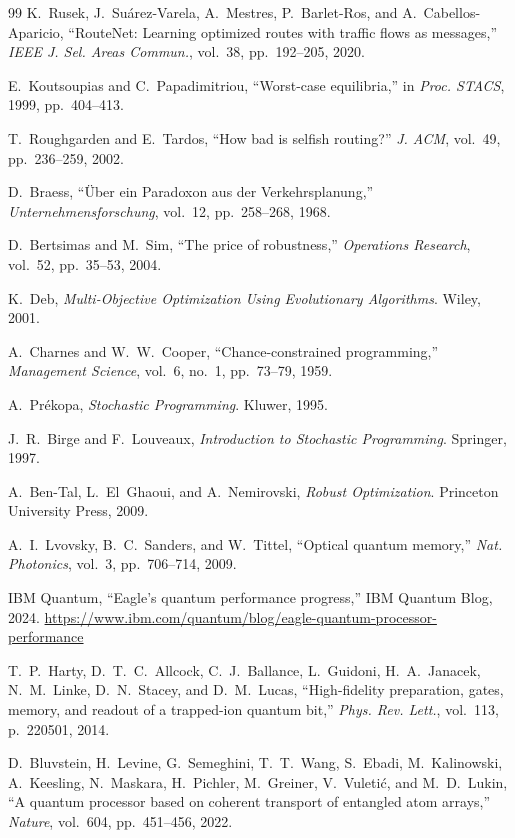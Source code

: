 \documentclass[twocolumn]{article}
\begin{document}
\begin{thebibliography}{99}
K.~Rusek, J.~Su\'arez-Varela, A.~Mestres, P.~Barlet-Ros, and
A.~Cabellos-Aparicio, ``RouteNet: Learning optimized routes with
traffic flows as messages,''
\emph{IEEE J. Sel. Areas Commun.}, vol.~38, pp.~192--205, 2020.

E.~Koutsoupias and C.~Papadimitriou,
``Worst-case equilibria,''
in \emph{Proc. STACS}, 1999, pp.~404--413.

T.~Roughgarden and E.~Tardos,
``How bad is selfish routing?''
\emph{J. ACM}, vol.~49, pp.~236--259, 2002.

D.~Braess, ``\"Uber ein Paradoxon aus der Verkehrsplanung,''
\emph{Unternehmensforschung}, vol.~12, pp.~258--268, 1968.

D.~Bertsimas and M.~Sim, ``The price of robustness,''
\emph{Operations Research}, vol.~52, pp.~35--53, 2004.

K.~Deb, \emph{Multi-Objective Optimization Using Evolutionary
Algorithms}.  Wiley, 2001.

A.~Charnes and W.~W.~Cooper,
``Chance-constrained programming,''
\emph{Management Science}, vol.~6, no.~1, pp.~73--79, 1959.

A.~Pr\'ekopa, \emph{Stochastic Programming}.  Kluwer, 1995.

J.~R.~Birge and F.~Louveaux, \emph{Introduction to Stochastic
Programming}.  Springer, 1997.

A.~Ben-Tal, L.~El~Ghaoui, and A.~Nemirovski, \emph{Robust
Optimization}.  Princeton University Press, 2009.

A.~I.~Lvovsky, B.~C.~Sanders, and W.~Tittel,
``Optical quantum memory,''
\emph{Nat. Photonics}, vol.~3, pp.~706--714, 2009.

IBM Quantum, ``Eagle's quantum performance progress,''
IBM Quantum Blog, 2024.
\url{https://www.ibm.com/quantum/blog/eagle-quantum-processor-performance}

T.~P.~Harty, D.~T.~C.~Allcock, C.~J.~Ballance, L.~Guidoni,
H.~A.~Janacek, N.~M.~Linke, D.~N.~Stacey, and D.~M.~Lucas,
``High-fidelity preparation, gates, memory, and readout of a
trapped-ion quantum bit,''
\emph{Phys. Rev. Lett.}, vol.~113, p.~220501, 2014.

D.~Bluvstein, H.~Levine, G.~Semeghini, T.~T.~Wang, S.~Ebadi,
M.~Kalinowski, A.~Keesling, N.~Maskara, H.~Pichler, M.~Greiner,
V.~Vuleti\'c, and M.~D.~Lukin,
``A quantum processor based on coherent transport of entangled atom
arrays,''
\emph{Nature}, vol.~604, pp.~451--456, 2022.


\end{thebibliography}
\end{document}

